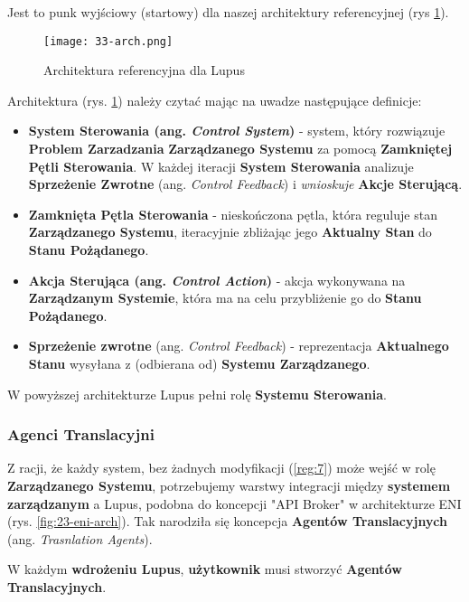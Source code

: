 Jest to punk wyjściowy (startowy) dla naszej architektury referencyjnej (rys \ref{fig:33-arch}).

\begin{figure}[!h]
    \centering \texttt{[image: 33-arch.png]}
    \caption{Architektura referencyjna dla Lupus}\label{fig:33-arch}
\end{figure}

Architektura (rys. \ref{fig:33-arch}) należy czytać mając na uwadze następujące definicje:

\begin{itemize}
    \item \textbf{System Sterowania (ang. \textit{Control System})} - system, który rozwiązuje \textbf{Problem Zarzadzania} \textbf{Zarządzanego Systemu} za pomocą \textbf{Zamkniętej Pętli Sterowania}. W każdej iteracji \textbf{System Sterowania} analizuje \textbf{Sprzeżenie Zwrotne} (ang. \textit{Control Feedback}) i \textit{wnioskuje} \textbf{Akcje Sterującą}.
    \item \textbf{Zamknięta Pętla Sterowania} - nieskończona pętla, która reguluje stan \textbf{Zarządzanego Systemu}, iteracyjnie zbliżając jego \textbf{Aktualny Stan} do \textbf{Stanu Pożądanego}. 
    \item \textbf{Akcja Sterująca (ang. \textit{Control Action})} - akcja wykonywana na \textbf{Zarządzanym Systemie}, która ma na celu przybliżenie go do \textbf{Stanu Pożądanego}.
    \item \textbf{Sprzeżenie zwrotne} (ang. \textit{Control Feedback}) - reprezentacja \textbf{Aktualnego Stanu} wysyłana z (odbierana od) \textbf{Systemu Zarządzanego}.
\end{itemize}

W powyższej architekturze Lupus pełni rolę \textbf{Systemu Sterowania}.

\subsubsection{Agenci Translacyjni}
Z racji, że każdy system, bez żadnych modyfikacji (\ref{reg:7}) może wejść w rolę \textbf{Zarządzanego Systemu}, potrzebujemy warstwy integracji między \textbf{systemem zarządzanym} a Lupus, podobna do koncepcji "API Broker" w architekturze ENI (rys. \ref{fig:23-eni-arch}). Tak narodziła się koncepcja \textbf{Agentów Translacyjnych} (ang. \textit{Trasnlation Agents}). 

W każdym \textbf{wdrożeniu Lupus}, \textbf{użytkownik} musi stworzyć \textbf{Agentów Translacyjnych}. 

